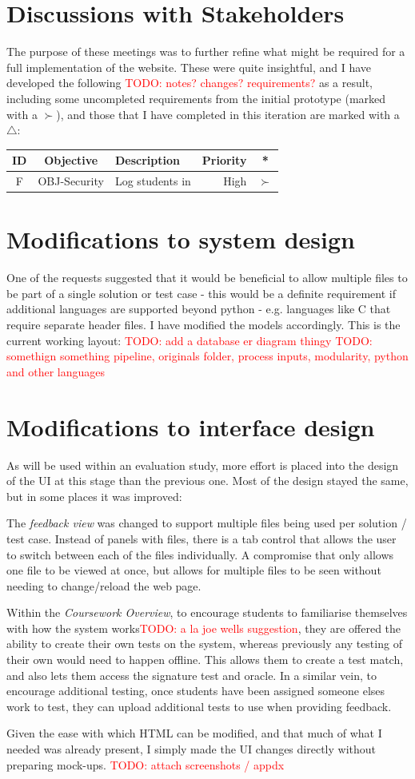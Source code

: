 \documentclass[a4paper,11pt]{report}
\newcommand{\todo}[1]{\textcolor{red}{TODO: #1}}
\newcounter{FunCount}
\newcommand{\freq}[4]{\addtocounter{FunCount}{1}F\arabic{FunCount} & OBJ-#1 & #2 & #3 & #4\\}
\begin{document}
\section{Discussions with Stakeholders}
The purpose of these meetings was to further refine what might be required for a full implementation of the website. These were quite insightful, and I have developed the following \todo{notes? changes? requirements?} as a result, including some uncompleted requirements from the initial prototype (marked with a $\succ$), and those that I have completed in this iteration are marked with a $\bigtriangleup$:
\begin{longtable}{cclrc}
\textbf{ID} & \textbf{Objective} & \textbf{Description} & \textbf{Priority} & \textbf{*}\\\hline
\freq{Security}{Log students in}{High}{$\succ$}
\end{longtable}

\section{Modifications to system design}
One of the requests suggested that it would be beneficial to allow multiple files to be part of a single solution or test case - this would be a definite requirement if additional languages are supported beyond python - e.g. languages like C that require separate header files. I have modified the models accordingly. This is the current working layout:
\todo{add a database er diagram thingy}
\todo{somethign something pipeline, originals folder, process inputs, modularity, python and other languages}

\section{Modifications to interface design}
As will be used within an evaluation study, more effort is placed into the design of the UI at this stage than the previous one. Most of the design stayed the same, but in some places it was improved:\par
The \textit{feedback view} was changed to support multiple files being used per solution / test case. Instead of panels with files, there is a tab control that allows the user to switch between each of the files individually. A compromise that only allows one file to be viewed at once, but allows for multiple files to be seen without needing to change/reload the web page.\par
Within the \textit{Coursework Overview}, to encourage students to familiarise themselves with how the system works\todo{a la joe wells suggestion}, they are offered the ability to create their own tests on the system, whereas previously any testing of their own would need to happen offline. This allows them to create a test match, and also lets them access the signature test and oracle. In a similar vein, to encourage additional testing, once students have been assigned someone elses work to test, they can upload additional tests to use when providing feedback.\par
Given the ease with which HTML can be modified, and that much of what I needed was already present, I simply made the UI changes directly without preparing mock-ups. \todo{attach screenshots / appdx}
\end{document}
